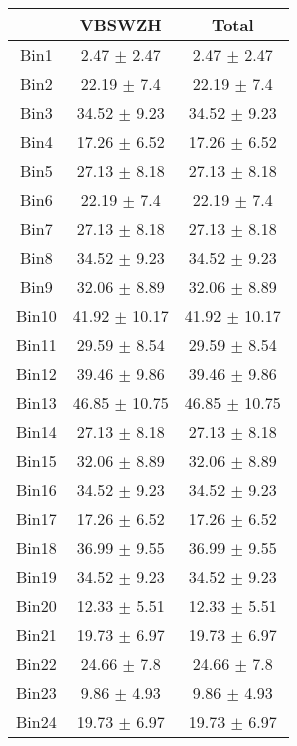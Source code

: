   \begin{tabular}{|c|c|c|}
  \hline
      & VBSWZH & Total \\ \cline{1-3} 
     \hline\hline
     Bin1 & 2.47 $\pm$ 2.47 & 2.47 $\pm$ 2.47 \\ \cline{1-3} 
     Bin2 & 22.19 $\pm$ 7.4 & 22.19 $\pm$ 7.4 \\ \cline{1-3} 
     Bin3 & 34.52 $\pm$ 9.23 & 34.52 $\pm$ 9.23 \\ \cline{1-3} 
     Bin4 & 17.26 $\pm$ 6.52 & 17.26 $\pm$ 6.52 \\ \cline{1-3} 
     Bin5 & 27.13 $\pm$ 8.18 & 27.13 $\pm$ 8.18 \\ \cline{1-3} 
     Bin6 & 22.19 $\pm$ 7.4 & 22.19 $\pm$ 7.4 \\ \cline{1-3} 
     Bin7 & 27.13 $\pm$ 8.18 & 27.13 $\pm$ 8.18 \\ \cline{1-3} 
     Bin8 & 34.52 $\pm$ 9.23 & 34.52 $\pm$ 9.23 \\ \cline{1-3} 
     Bin9 & 32.06 $\pm$ 8.89 & 32.06 $\pm$ 8.89 \\ \cline{1-3} 
     Bin10 & 41.92 $\pm$ 10.17 & 41.92 $\pm$ 10.17 \\ \cline{1-3} 
     Bin11 & 29.59 $\pm$ 8.54 & 29.59 $\pm$ 8.54 \\ \cline{1-3} 
     Bin12 & 39.46 $\pm$ 9.86 & 39.46 $\pm$ 9.86 \\ \cline{1-3} 
     Bin13 & 46.85 $\pm$ 10.75 & 46.85 $\pm$ 10.75 \\ \cline{1-3} 
     Bin14 & 27.13 $\pm$ 8.18 & 27.13 $\pm$ 8.18 \\ \cline{1-3} 
     Bin15 & 32.06 $\pm$ 8.89 & 32.06 $\pm$ 8.89 \\ \cline{1-3} 
     Bin16 & 34.52 $\pm$ 9.23 & 34.52 $\pm$ 9.23 \\ \cline{1-3} 
     Bin17 & 17.26 $\pm$ 6.52 & 17.26 $\pm$ 6.52 \\ \cline{1-3} 
     Bin18 & 36.99 $\pm$ 9.55 & 36.99 $\pm$ 9.55 \\ \cline{1-3} 
     Bin19 & 34.52 $\pm$ 9.23 & 34.52 $\pm$ 9.23 \\ \cline{1-3} 
     Bin20 & 12.33 $\pm$ 5.51 & 12.33 $\pm$ 5.51 \\ \cline{1-3} 
     Bin21 & 19.73 $\pm$ 6.97 & 19.73 $\pm$ 6.97 \\ \cline{1-3} 
     Bin22 & 24.66 $\pm$ 7.8 & 24.66 $\pm$ 7.8 \\ \cline{1-3} 
     Bin23 & 9.86 $\pm$ 4.93 & 9.86 $\pm$ 4.93 \\ \cline{1-3} 
     Bin24 & 19.73 $\pm$ 6.97 & 19.73 $\pm$ 6.97 \\ \cline{1-3} 

\end{tabular}
